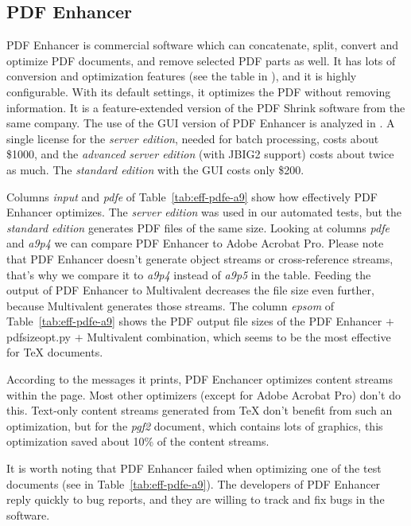 \documentclass{ltugproc}
\def\cmd{\textsf}
\begin{document}
\subsection{PDF Enhancer}

PDF Enhancer \cite{pdfenhancer} is commercial software which can
concatenate, split, convert and optimize PDF documents, and remove selected
PDF parts as well. It has lots of conversion and optimization features (see
the table in \cite{pdfenhancer-features}), and it is highly configurable.
With its default settings, it optimizes the PDF without removing
information. It is a feature-extended version of the PDF Shrink software from
the same company. The use of the GUI version of PDF Enhancer is analyzed in
\cite{pdftweak}. A single license for the \emph{server edition}, needed for
batch processing, costs about \$1000, and the \emph{advanced server
edition} (with JBIG2 support) costs about twice as much. The
\emph{standard edition} with the GUI costs only \$200.

Columns \emph{input} and \emph{pdfe} of Table~\ref{tab:eff-pdfe-a9} show how
effectively PDF Enhancer optimizes. The \emph{server edition} was used in our
automated tests, but the \emph{standard edition} generates PDF files of the
same size. Looking at columns \emph{pdfe} and
\emph{a9p4} we can compare PDF Enhancer to Adobe Acrobat Pro. Please note that
PDF Enhancer doesn't generate object streams or cross-reference streams,
that's why we compare it to \emph{a9p4} instead of \emph{a9p5} in the table.
Feeding the output of PDF Enhancer to Multivalent decreases the file size
even further, because Multivalent generates those streams. The column
\emph{epsom} of Table~\ref{tab:eff-pdfe-a9} shows the PDF output file sizes
of the PDF Enhancer $+$ \cmd{pdfsizeopt.py} $+$ Multivalent combination, which
seems to be the most effective for \TeX{} documents.

According to the messages it prints, PDF Enchancer optimizes content streams
within the page. Most other optimizers (except for Adobe Acrobat Pro) don't do
this. Text-only content streams generated from \TeX{} don't benefit from
such an optimization, but for the \emph{pgf2} document, which contains lots of
graphics, this optimization saved about 10\% of the content streams.

It is worth noting that PDF Enhancer failed when optimizing one of the test
documents (see in Table~\ref{tab:eff-pdfe-a9}). The developers of PDF Enhancer
reply quickly to bug reports, and they are willing to track and fix bugs
in the software.
\end{document}
